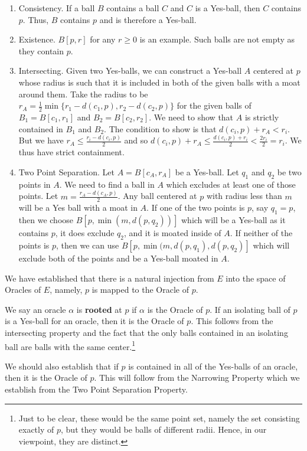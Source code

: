 \documentclass[12pt]{article}
\begin{document}
\begin{enumerate}
    \item Consistency. If a ball $B$ contains a ball $C$ and $C$ is a Yes-ball, then $C$ contains $p$. Thus, $B$ contains $p$ and is therefore a Yes-ball. 
    \item Existence. $B[p, r]$ for any $r \geq 0$ is an example. Such balls are not empty as they contain $p$. 
    \item Intersecting. Given two Yes-balls, we can construct a Yes-ball $A$ centered at $p$ whose radius is such that it is included in both of the given balls with a moat around them. Take the radius to be $r_A = \frac{1}{2}\min\{r_1 - d(c_1, p), r_2 - d(c_2, p)\}$ for the given balls of $B_1 = B[c_1, r_1]$ and $B_2 = B[c_2, r_2]$. We need to show that $A$ is strictly contained in $B_1$ and $B_2$. The condition to show is that $d(c_i, p) + r_A < r_i$. But we have $r_A \leq \frac{r_i - d(c_i, p)}{2}$ and so $d(c_i, p) + r_A \leq \frac{d(c_i, p) + r_i}{2} < \frac{2 r_i}{2} = r_i$. We thus have strict containment. 
    \item Two Point Separation. Let $A = B[c_A, r_A]$ be a Yes-ball. Let $q_1$ and $q_2$ be two points in $A$. We need to find a ball in $A$ which excludes at least one of those points. Let $m = \frac{ r_A - d(c_A, p)}{2}$. Any ball centered at $p$ with radius less than $m$ will be a Yes ball with a moat in $A$. If one of the two points is $p$, say $q_1 = p$, then we choose $B[p, \min(m, d(p, q_2))]$ which will be a Yes-ball as it contains $p$, it does exclude $q_2$, and it is moated inside of $A$. If neither of the points is $p$, then we can use $B[p, \min(m, d(p, q_1), d(p, q_2)]$ which will exclude both of the points and be a Yes-ball moated in $A$. 
\end{enumerate}

We have established that there is a natural injection from $E$ into the space of Oracles of $E$, namely, $p$ is mapped to the Oracle of $p$. 

We say an oracle $\alpha$ is \textbf{rooted} at $p$ if $\alpha$ is the Oracle of $p$. If an isolating ball of $p$ is a Yes-ball for an oracle, then it is the Oracle of $p$. This follows from the intersecting property and the fact that the only balls contained in an isolating ball are balls with the same center.\footnote{Just to be clear, these would be the same point set, namely the set consisting exactly of $p$, but they would be balls of different radii. Hence, in our viewpoint, they are distinct.} 

We should also establish that if $p$ is contained in all of the Yes-balls of an oracle, then it is the Oracle of $p$. This will follow from the Narrowing Property which we establish from the Two Point Separation Property. 
\end{document}

